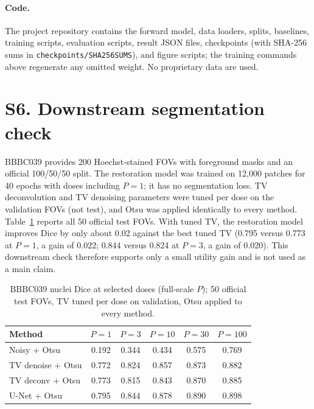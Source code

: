 \documentclass[11pt]{article}
\begin{document}
\paragraph{Code.}
The project repository contains the forward model, data loaders, splits,
baselines, training scripts, evaluation scripts, result JSON files,
checkpoints (with SHA-256 sums in \texttt{checkpoints/SHA256SUMS}), and figure
scripts; the training commands above regenerate any omitted weight. No
proprietary data are used.

\section*{S6. Downstream segmentation check}
BBBC039 provides 200 Hoechst-stained FOVs with foreground masks and an official
100/50/50 split. The restoration model was trained on 12{,}000 patches for 40
epochs with doses including $P=1$; it has no segmentation loss. TV
deconvolution and TV denoising parameters were tuned per dose on the
validation FOVs (not test), and Otsu \cite{otsu1979} was applied identically to every method.
Table~\ref{tab:seg} reports all 50 official test FOVs. With tuned TV, the
restoration model improves Dice by only about 0.02 against the best tuned TV
(0.795 versus 0.773 at $P=1$, a gain of 0.022; 0.844 versus 0.824 at $P=3$, a
gain of 0.020). This downstream check therefore supports only a small utility
gain and is not used as a main claim.

\begin{table}[h]
\centering
\caption{BBBC039 nuclei Dice at selected doses (full-scale $P$); 50 official
test FOVs, TV tuned per dose on validation, Otsu applied to every method.}
\label{tab:seg}
\begin{tabular}{lccccc}
\toprule
Method & $P=1$ & $P=3$ & $P=10$ & $P=30$ & $P=100$ \\
\midrule
Noisy + Otsu & 0.192 & 0.344 & 0.434 & 0.575 & 0.769 \\
TV denoise + Otsu & 0.772 & 0.824 & 0.857 & 0.873 & 0.882 \\
TV deconv + Otsu & 0.773 & 0.815 & 0.843 & 0.870 & 0.885 \\
U-Net + Otsu & 0.795 & 0.844 & 0.878 & 0.890 & 0.898 \\
\bottomrule
\end{tabular}
\end{table}
\end{document}
